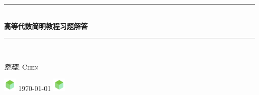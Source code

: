 \documentclass[11pt,a4paper,openany,oneside]{book}
\newcommand{\HRule}{\rule{\linewidth}{0.5mm}}
\begin{document}
\begin{titlepage}
	
	\begin{center}
		
		
		    
		
		
		
		
		\HRule \\[1cm]
		{ \Huge \bfseries 高等代数简明教程习题解答}\\[0.5cm]
		
		\HRule \\[1.5cm]
		
		\begin{minipage}{0.9\textwidth}
			\begin{flushright} \large
				\LARGE\emph{整理}: 
				\textsc{\huge Chen}
			\end{flushright}
		\end{minipage}

	    \vfill
		
		
		
		\includegraphics[width=0.048\textwidth]{./logo}%
		{\hspace{5em}\Large\today\hspace{3em}}
		\includegraphics[width=0.048\textwidth]{./logo}%
	\end{center}
	
	\end{titlepage}

\newpage

~\\
\end{document}
